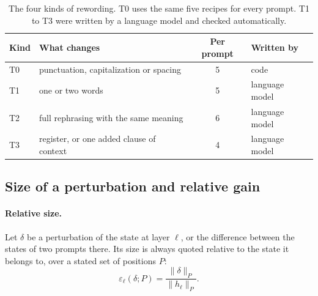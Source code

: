 \documentclass[11pt]{article}
\newcommand{\nrm}[2]{\lVert #1\rVert_{#2}}
\begin{document}
\begin{table}[ht]
\centering
\caption{The four kinds of rewording. T0 uses the same five recipes for every prompt. T1 to T3 were written by a language model and checked automatically.}
\label{tab:kinds}
\begin{tabular}{llcl}
\toprule
Kind & What changes & Per prompt & Written by \\
\midrule
T0 & punctuation, capitalization or spacing & 5 & code \\
T1 & one or two words & 5 & language model \\
T2 & full rephrasing with the same meaning & 6 & language model \\
T3 & register, or one added clause of context & 4 & language model \\
\bottomrule
\end{tabular}
\end{table}

\subsection{Size of a perturbation and relative gain}
\label{sec:gain}

\paragraph{Relative size.} Let $\delta$ be a perturbation of the state at layer $\ell$, or the difference between the states of two prompts there. Its size is always quoted relative to the state it belongs to, over a stated set of positions $P$:
\begin{equation}
\varepsilon_\ell(\delta;P)=\frac{\nrm{\delta}{P}}{\nrm{h_\ell}{P}} .
\label{eq:eps}
\end{equation}
\end{document}
